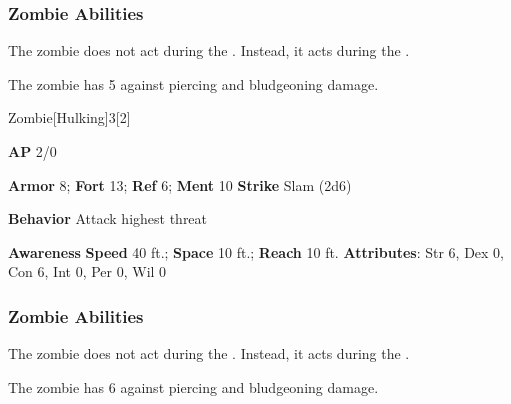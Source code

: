 \subsubsection{Zombie Abilities}

The zombie does not act during the .
Instead, it acts during the .

\vspace{0.5em}
The zombie has  5 against piercing and bludgeoning damage.

\begin{monsection}{Zombie}[Hulking]{3}[2]
\vspace{-1em}\vspace{-1em}
\begin{spellcontent}
\begin{spelltargetinginfo}
{\textbf{AP} 2/0}

\pari \textbf{Armor} 8;
\textbf{Fort} 13;
\textbf{Ref} 6;
\textbf{Ment} 10
\pari \textbf{Strike} Slam  (2d6)



\pari \textbf{Behavior} Attack highest threat
\end{spelltargetinginfo}
\end{spellcontent}

\begin{monsterfooter}
\pari \textbf{Awareness} 
\pari \textbf{Speed} 40 ft.;
\textbf{Space} 10 ft.;
\textbf{Reach} 10 ft.
\pari \textbf{Attributes}:
Str 6,
Dex 0,
Con 6,
Int 0,
Per 0,
Wil 0
\end{monsterfooter}
\end{monsection}


\subsubsection{Zombie Abilities}

The zombie does not act during the .
Instead, it acts during the .

\vspace{0.5em}
The zombie has  6 against piercing and bludgeoning damage.

